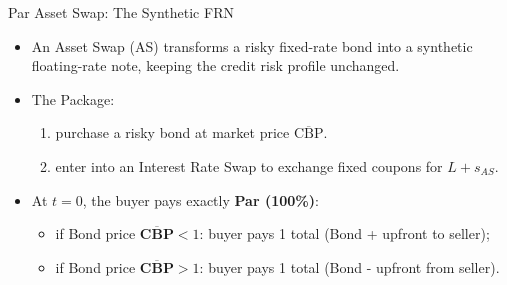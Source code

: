 \documentclass{beamer}
\begin{document}
\begin{frame}{Par Asset Swap: The Synthetic FRN}
	\begin{itemize}
		\item An \textcolor{maincolor}{Asset Swap (AS)} transforms a risky fixed-rate bond into a synthetic floating-rate note, keeping the credit risk profile unchanged.
		\item The Package:
		\begin{enumerate}
			\item purchase a risky bond at market price $\overline{\text{CBP}}$.
			\item enter into an Interest Rate Swap to exchange fixed coupons for $L+s_{AS}$.
		\end{enumerate}
		\item At $t=0$, the buyer pays exactly \textbf{Par (100\%)}:
		\begin{itemize}
			\item if Bond price $\overline{\textbf{CBP}}<1$: buyer pays 1 total (Bond + upfront to seller);
			\item if Bond price $\overline{\textbf{CBP}}>1$: buyer pays 1 total (Bond - upfront from seller).
		\end{itemize}
	\end{itemize}
	
\end{frame}
\end{document}
